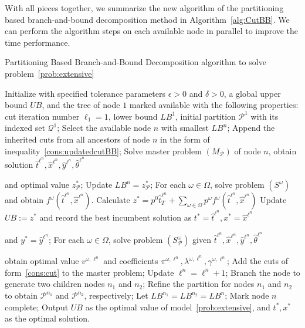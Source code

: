 \documentclass[11pt]{article}
\begin{document}
	With all pieces together, we summarize the new algorithm of the partitioning based branch-and-bound decomposition method in Algorithm~\ref{alg:CutBB}. We can perform the algorithm steps on each available node in parallel to improve the time performance.
	\begin{algorithm}
		\caption{Partitioning Based Branch-and-Bound Decomposition algorithm to solve problem~\eqref{prob:extensive}}
		\label{alg:CutBB}
		\begin{algorithmic}[1]
			\State Initialize with specified tolerance parameters \(\epsilon > 0\) and \(\delta > 0\), a global upper bound \(UB\), and the tree of node \(1\) marked available with the following properties: cut iteration number \(\ell_1 = 1\), lower bound \(LB^1\), initial partition \(\mathcal{P}^1\) with its indexed set \(\mathcal{Q}^1\);
			\State Select the available node \(n\) with smallest \(LB^n\);
			\State Append the inherited cuts from all ancestors of node \(n\) in the form of inequality~\eqref{cons:updatedcutBB};
			\Repeat
			\State Solve master problem \((M_{\mathcal{P}})\) of node \(n\), obtain solution \(\hat{t}^{\ell^n}, \hat{x}^{\ell^n}, \hat{y}^{\ell^n}, \hat{\theta}^{\ell^n}\) 
			
			\hspace{1cm} and optimal value \(z_{\mathcal{P}}^*\);
			\State Update \(LB^n = z_{\mathcal{P}}^*\);
			\EndIf
			\State For each \(\omega \in \Omega\), solve problem \((S^\omega)\) and obtain \(f^{\omega}(\hat{t}^{\ell^n},\hat{x}^{\ell^n})\). 
			\State Calculate \(z^* = p^0 \hat{t}^{\ell^n}_T + \sum_{\omega \in \Omega} p^\omega f^{\omega}(\hat{t}^{\ell^n},\hat{x}^{\ell^n})\)
			\State Update \(UB := z^*\) and record the best incumbent solution as \(t^* = \hat{t}^{\ell^n}, x^* = \hat{x}^{\ell^n}\) 
			
			\hspace{1.7cm} and \(y^* = \hat{y}^{\ell^n}\);
			\EndIf
			\State For each \(\omega \in \Omega\), solve problem \((S_{\mathcal{P}}^\omega)\) given \(\hat{t}^{\ell^n}, \hat{x}^{\ell^n}, \hat{y}^{\ell^n}, \hat{\theta}^{\ell^n}\)
			
			\hspace{1cm} obtain optimal value \(v^{\omega,\ell^n}\) and coefficients \(\pi^{\omega,\ell^n}, \lambda^{\omega,\ell^n}, \gamma^{\omega,\ell^n}\);
			\State Add the cuts of form~\eqref{cons:cut} to the master problem;
			\State Update \(\ell^n = \ell^n + 1\);
			\State Branch the node to generate two children nodes \(n_1\) and \(n_2\);
			\State Refine the partition for nodes \(n_1\) and \(n_2\) to obtain \(\mathcal{P}^{n_1}\) and \(\mathcal{P}^{n_2}\), respectively;
			\State Let \(LB^{n_1} = LB^{n_2} = LB^n\);
			\Else
			\State Mark node \(n\) complete;
			\EndIf
			\vspace{0.1cm}
			\State Output \(UB\) as the optimal value of model~\eqref{prob:extensive}, and \(t^*, x^*\) as the optimal solution.
		\end{algorithmic}
	\end{algorithm}
	
\end{document}
